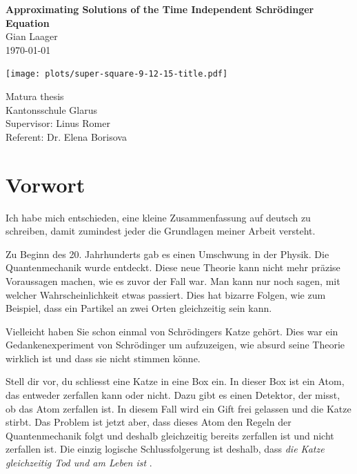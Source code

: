 \documentclass[11pt,DIV=10,final]{scrreprt} %
\begin{document}
\begin{titlepage}
\mbox{}\vspace{0.1\textheight}
\begin{center}
\textbf{\Huge Approximating Solutions of the Time Independent Schrödinger Equation}\\[3ex]
Gian Laager\\
\today
\vspace{0.05\textheight}
\begin{center}
	\texttt{[image: plots/super-square-9-12-15-title.pdf]}
\end{center}
\vspace{0.05\textheight}
Matura thesis\\
Kantonsschule Glarus\\[3ex]
Supervisor: Linus Romer\\
Referent: Dr. Elena Borisova
\end{center}
\end{titlepage}


\tableofcontents

\pagebreak[4]

\chapter*{Vorwort}
Ich habe mich entschieden, eine kleine Zusammenfassung auf deutsch zu schreiben, damit zumindest jeder die Grundlagen meiner Arbeit versteht.

Zu Beginn des 20. Jahrhunderts gab es einen Umschwung in der Physik. Die Quantenmechanik wurde entdeckt. Diese neue Theorie kann nicht mehr präzise Voraussagen machen, wie es zuvor der Fall war.
Man kann nur noch sagen, mit welcher Wahrscheinlichkeit etwas passiert. Dies hat bizarre Folgen, wie zum Beispiel, dass ein Partikel an zwei Orten gleichzeitig sein kann.

Vielleicht haben Sie schon einmal von Schrödingers Katze gehört. Dies war ein Gedankenexperiment von Schrödinger um aufzuzeigen, wie absurd seine Theorie wirklich ist und dass sie nicht stimmen könne.

Stell dir vor, du schliesst eine Katze in eine Box ein. In dieser Box ist ein Atom, das entweder zerfallen kann oder nicht. Dazu gibt es einen Detektor, der misst, ob das Atom zerfallen ist. In diesem Fall
wird ein Gift frei gelassen und die Katze stirbt.
Das Problem ist jetzt aber, dass dieses Atom den Regeln der Quantenmechanik folgt und deshalb gleichzeitig bereits zerfallen ist und nicht zerfallen ist. Die einzig logische Schlussfolgerung ist deshalb,
dass \emph{die Katze gleichzeitig Tod und am Leben ist} \citep{schrodinger1935gegenwartige}.
\end{document}
